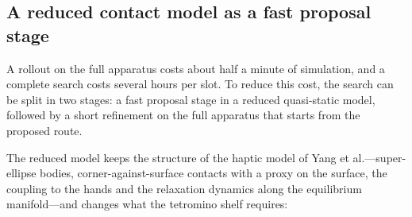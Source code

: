 \subsection{A reduced contact model as a fast proposal stage}

A rollout on the full apparatus costs about half a minute of simulation, and a complete search costs several hours per slot. To reduce this cost, the search can be split in two stages: a fast proposal stage in a reduced quasi-static model, followed by a short refinement on the full apparatus that starts from the proposed route.

The reduced model keeps the structure of the haptic model of Yang et al.---super-ellipse bodies, corner-against-surface contacts with a proxy on the surface, the coupling to the hands and the relaxation dynamics along the equilibrium manifold---and changes what the tetromino shelf requires:
